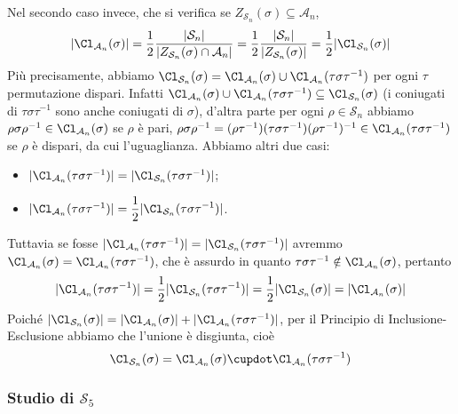 \documentclass[11pt]{scrartcl}
\begin{document}
	Nel secondo caso invece, che si verifica se $Z_{\mathcal{S}_n}(\sigma)\subseteq 
	\mathcal{A}_n$,
	\[
	|\Cl_{\mathcal{A}_n}(\sigma)| = \frac 1 2 \frac{|\mathcal{S}_n|}{|Z_{\mathcal{S}_n}(\sigma)\cap\mathcal{A}_n|}
	= \frac 1 2 \frac{|\mathcal{S}_n|}{|Z_{\mathcal{S}_n}(\sigma)|} = \frac 1 2 |\Cl_{\mathcal{S}_n}(\sigma)|
	\]
	Più precisamente, abbiamo $\Cl_{\mathcal{S}_n}(\sigma) = \Cl_{\mathcal{A}_n}(\sigma) \cup
	\Cl_{\mathcal{A}_n}(\tau\sigma\tau^{-1})$ per ogni $\tau$ permutazione dispari. 
	Infatti $\Cl_{\mathcal{A}_n}(\sigma) \cup \Cl_{\mathcal{A}_n}(\tau\sigma\tau^{-1})
	\subseteq \Cl_{\mathcal{S}_n}(\sigma)$ (i coniugati di $\tau\sigma\tau^{-1}$ sono anche
	coniugati di $\sigma$), d'altra parte per ogni $\rho \in \mathcal{S}_n$ abbiamo
	$\rho\sigma\rho^{-1} \in \Cl_{\mathcal{A}_n}(\sigma)$ se $\rho$ è pari,
	$\rho\sigma\rho^{-1} = (\rho\tau^{-1})(\tau\sigma\tau^{-1})(\rho\tau^{-1})^{-1}
	\in \Cl_{\mathcal{A}_n}(\tau\sigma\tau^{-1})$ se $\rho$ è dispari, da cui l'uguaglianza.
	Abbiamo altri due casi:
	\begin{itemize}
		\item $|\Cl_{\mathcal{A}_n}(\tau\sigma\tau^{-1})| = |\Cl_{\mathcal{S}_n}(\tau\sigma\tau^{-1})|$;
		\item $|\Cl_{\mathcal{A}_n}(\tau\sigma\tau^{-1})| = \displaystyle\frac 1 2
		|\Cl_{\mathcal{S}_n}(\tau\sigma\tau^{-1})|$.
	\end{itemize}
	Tuttavia se fosse $|\Cl_{\mathcal{A}_n}(\tau\sigma\tau^{-1})| = |\Cl_{\mathcal{S}_n}(\tau\sigma\tau^{-1})|$
	avremmo $\Cl_{\mathcal{A}_n}(\sigma) = \Cl_{\mathcal{A}_n}(\tau\sigma\tau^{-1})$,
	che è assurdo in quanto $\tau\sigma\tau^{-1} \notin \Cl_{\mathcal{A}_n}(\sigma)$,
	pertanto \[
	|\Cl_{\mathcal{A}_n}(\tau\sigma\tau^{-1})| = \displaystyle\frac 1 2
	|\Cl_{\mathcal{S}_n}(\tau\sigma\tau^{-1})| = \frac 1 2|\Cl_{\mathcal{S}_n}(\sigma)| =
	|\Cl_{\mathcal{A}_n}(\sigma)|
	\]
	Poiché 
	$|\Cl_{\mathcal{S}_n}(\sigma)| = |\Cl_{\mathcal{A}_n}(\sigma)| + |\Cl_{\mathcal{A}_n}(\tau\sigma\tau^{-1})|$,
	per il Principio di Inclusione-Esclusione abbiamo che l'unione è disgiunta,
	cioè
	\[
	\Cl_{\mathcal{S}_n}(\sigma) = \Cl_{\mathcal{A}_n}(\sigma) \cupdot \Cl_{\mathcal{A}_n}(\tau\sigma\tau^{-1})
	\]
	
	\subsubsection{Studio di $\mathcal{S}_5$}
	
\end{document}
